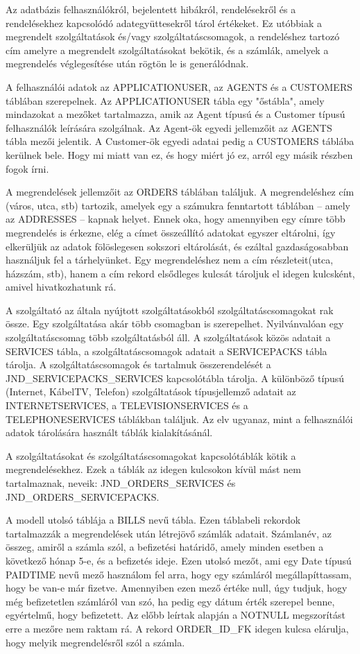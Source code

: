 \documentclass[centeredchapter]{thesis-ekf}
\theoremstyle{definition}
\theoremstyle{remark}
\begin{document}
Az adatbázis felhasználókról, bejelentett hibákról, rendelésekről és a rendelésekhez kapcsolódó adategyüttesekről tárol értékeket. Ez utóbbiak a megrendelt szolgáltatások és/vagy szolgáltatáscsomagok, a rendeléshez tartozó cím amelyre a megrendelt szolgáltatásokat bekötik, és a számlák, amelyek a megrendelés véglegesítése után rögtön le is generálódnak.

A felhasználói adatok az APPLICATIONUSER, az AGENTS és a CUSTOMERS táblában szerepelnek. Az APPLICATIONUSER tábla egy "őstábla", amely mindazokat a mezőket tartalmazza, amik az Agent típusú és a Customer típusú felhasználók leírására szolgálnak. Az Agent-ök egyedi jellemzőit az AGENTS tábla mezői jelentik. A Customer-ök egyedi adatai pedig a CUSTOMERS táblába kerülnek bele. Hogy mi miatt van ez, és hogy miért jó ez, arról egy másik részben fogok írni.

A megrendelések jellemzőit az ORDERS táblában találjuk. A megrendeléshez cím (város, utca, stb) tartozik, amelyek egy a számukra fenntartott táblában -- amely az ADDRESSES -- kapnak helyet. Ennek oka, hogy amennyiben egy címre több megrendelés is érkezne, elég a címet összeállító adatokat egyszer eltárolni, így elkerüljük az adatok fölöslegesen sokszori eltárolását, és ezáltal gazdaságosabban használjuk fel a tárhelyünket. Egy megrendeléshez nem a cím részleteit(utca, házszám, stb), hanem a cím rekord elsődleges kulcsát tároljuk el idegen kulcsként, amivel hivatkozhatunk rá.

A szolgáltató az általa nyújtott szolgáltatásokból szolgáltatáscsomagokat rak össze. Egy szolgáltatása akár több csomagban is szerepelhet. Nyilvánvalóan egy szolgáltatáscsomag több szolgáltatásból áll. A szolgáltatások közös adatait a SERVICES tábla, a szolgáltatáscsomagok adatait a SERVICEPACKS tábla tárolja. A szolgáltatáscsomagok és tartalmuk összerendelését a JND\_SERVICEPACKS\_SERVICES kapcsolótábla tárolja. A különböző típusú (Internet, KábelTV, Telefon) szolgáltatások típusjellemző adatait az INTERNETSERVICES, a TELEVISIONSERVICES és a TELEPHONESERVICES táblákban találjuk. Az elv ugyanaz, mint a felhasználói adatok tárolására használt táblák kialakításánál.

A szolgáltatásokat és szolgáltatáscsomagokat kapcsolótáblák kötik a megrendelésekhez. Ezek a táblák az idegen kulcsokon kívül mást nem tartalmaznak, neveik: JND\_ORDERS\_SERVICES és JND\_ORDERS\_SERVICEPACKS.

A modell utolsó táblája a BILLS nevű tábla. Ezen táblabeli rekordok tartalmazzák a megrendelések után létrejövő számlák adatait. Számlanév, az összeg, amiről a számla szól, a befizetési határidő, amely minden esetben a következő hónap 5-e, és a befizetés ideje. Ezen utolsó mezőt, ami egy Date típusú PAIDTIME nevű mező használom fel arra, hogy egy számláról megállapíttassam, hogy be van-e már fizetve. Amennyiben ezen mező értéke null, úgy tudjuk, hogy még befizetetlen számláról van szó, ha pedig egy dátum érték szerepel benne, egyértelmű, hogy befizetett. Az előbb leírtak alapján a NOTNULL megszorítást erre a mezőre nem raktam rá. A rekord ORDER\_ID\_FK idegen kulcsa elárulja, hogy melyik megrendelésről szól a számla.
\end{document}
